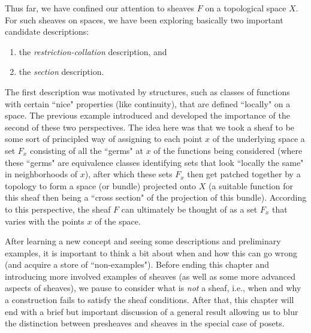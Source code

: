 \documentclass[11pt]{book}
\theoremstyle{definition}
\theoremstyle{definition}
\theoremstyle{definition}
\theoremstyle{theorem}
\theoremstyle{definition}
\begin{document}
Thus far, we have confined our attention to sheaves $F$ on a topological space $X$. For such sheaves on spaces, we have been exploring basically two important candidate descriptions: 
\begin{enumerate} 
	\item the \textit{restriction-collation} description, and 
	\item the \textit{section} description.
\end{enumerate} 
	The first description was motivated by structures, such as classes of functions with certain ``nice" properties (like continuity), that are defined ``locally" on a space. The previous example introduced and developed the importance of the second of these two perspectives. The idea here was that we took a sheaf to be some sort of principled way of assigning to each point $x$ of the underlying space a set $F_x$ consisting of all the ``germs" at $x$ of the functions being considered (where these ``germs" are equivalence classes identifying sets that look ``locally the same" in neighborhoods of $x$), after which these sets $F_x$ then get patched together by a topology to form a space (or bundle) projected onto $X$ (a suitable function for this sheaf then being a ``cross section" of the projection of this bundle). According to this perspective, the sheaf $F$ can ultimately be thought of as a set $F_x$ that varies with the points $x$ of the space. \par 
	After learning a new concept and seeing some descriptions and preliminary examples, it is important to think a bit about when and how this can go wrong (and acquire a store of ``non-examples"). Before ending this chapter and introducing more involved examples of sheaves (as well as some more advanced aspects of sheaves), we pause to consider what is \textit{not} a sheaf, i.e., when and why a construction fails to satisfy the sheaf conditions.  After that, this chapter will end with a brief but important discussion of a general result allowing us to blur the distinction between presheaves and sheaves in the special case of posets. 
\end{document}
